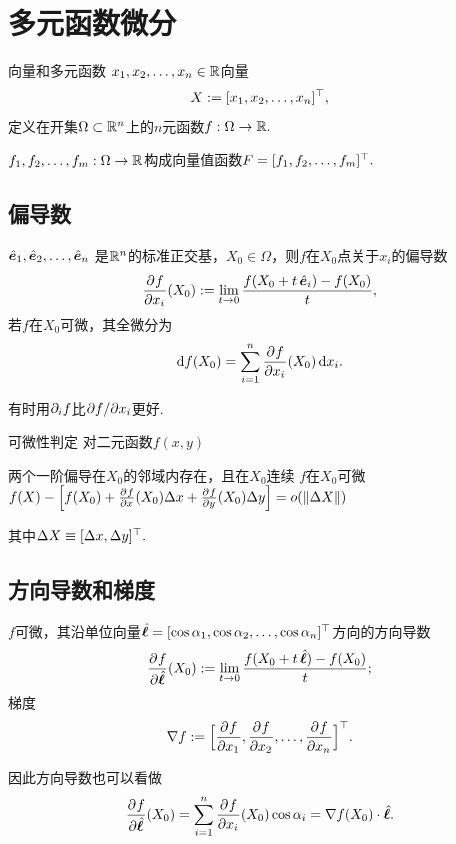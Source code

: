 \chapter{多元函数微分}
\begin{definition}{向量和多元函数}{}
	$x_1,x_2,\ldots,x_n \in \mathbb{R}$向量
	\[
		X := [x_1,x_2,\ldots,x_n]^\top,
	\]
	定义在开集$\Omega \subset \mathbb{R}^n$上的$n$元函数$f:\Omega \to \mathbb{R}.$
\end{definition}
$f_1,f_2,\ldots,f_m:\Omega \to \mathbb{R}$构成向量值函数$F = [f_1,f_2,\ldots,f_m]^\top.$
\section{偏导数}
\begin{definition}{}{}
	$\mathop{}\!\hat{\bm{e}}_1,\mathop{}\!\hat{\bm{e}}_2,\ldots,\mathop{}\!\hat{\bm{e}}_n$ 是$\mathbb{R}^n$的标准正交基，$X_0 \in \Omega$，则$f$在$X_0$点关于$x_i$的偏导数
	\begin{equation}\label{eq:calc-partial-derivative}
		\frac{\partial^{}f}{\partial{x_i}^{}}(X_0) := \lim_{t\to 0}\frac{f(X_0 + t\mathop{}\!\hat{\bm{e}}_i) - f(X_0)}t,
	\end{equation}
	若$f$在$X_0$可微，其全微分为
	\begin{align}
		\mathop{}\!\mathrm{d} f(X_0) = \sum_{i=1}^n\frac{\partial^{}f}{\partial{x_i}^{}}(X_0)\mathop{}\!\mathrm{d} x_i.
	\end{align}
\end{definition}
有时用$\partial_if$比$\partial f/\partial x_i$更好.
\begin{theorem}{可微性判定}{}
	对二元函数$f(x,y)$
	\begin{center}
		两个一阶偏导在$X_0$的邻域内存在，且在$X_0$连续
		\vimplies
		$f$在$X_0$可微
		\viff
		$f(X) - \Bigl[f(X_0) + \frac{\partial^{}f}{\partial{x}^{}}(X_0)\Delta x + \frac{\partial^{}f}{\partial{y}^{}}(X_0)\Delta y\Bigr] = o(\lVert\Delta X\rVert)$
	\end{center}
	其中$\Delta X \equiv [\Delta x,\Delta y]^\top.$
\end{theorem}
\section{方向导数和梯度}
\begin{definition}{}{}
	$f$可微，其沿单位向量$\mathop{}\!\hat{\bm{\ell}} = [\cos\alpha_1,\cos\alpha_2,\ldots,\cos\alpha_n]^\top$方向的方向导数 %
	\begin{equation}\label{eq:calc-directional-derivative}
		\frac{\partial^{}f}{\partial{\mathop{}\!\hat{\bm{\ell}}}^{}}(X_0) := \lim_{t\to 0}\frac{f(X_0 + t\mathop{}\!\hat{\bm{\ell}}) - f(X_0)}t;
	\end{equation}
	梯度
	\begin{equation}\label{eq:calc-gradient}
		\nabla f := \Bigl[\frac{\partial^{}f}{\partial{x_1}^{}},\frac{\partial^{}f}{\partial{x_2}^{}},\ldots,\frac{\partial^{}f}{\partial{x_n}^{}}\Bigr]^\top.
	\end{equation}
\end{definition}
因此方向导数也可以看做
\begin{align}
	\frac{\partial^{}f}{\partial{\mathop{}\!\hat{\bm{\ell}}}^{}}(X_0) = \sum_{i=1}^n\frac{\partial^{}f}{\partial{x_i}^{}}(X_0)\cos\alpha_i = \nabla f(X_0) \cdot \mathop{}\!\hat{\bm{\ell}}.
\end{align}
